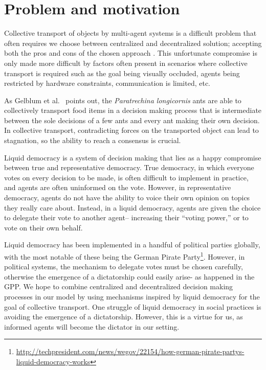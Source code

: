\documentclass[12pt]{article}
\begin{document}

\section{Problem and motivation} 
Collective transport of objects by multi-agent systems is a difficult problem that often requires we choose between centralized and decentralized solution; accepting both the pros and cons of the chosen approach \cite{rubenstein2013collective, chen2015occlusion, mccreery2016collective}. 
This unfortunate compromise is only made more difficult by factors often present in scenarios where collective transport is required such as the goal being visually occluded, agents being restricted by hardware constraints, communication is limited, etc.


As Gelblum et al.~\cite{gelblum2015ant} points out, the \emph{Paratrechina longicornis} ants are able to collectively transport food items in a decision making process that is intermediate between the sole decisions of a few ants and every ant making their own decision.
In collective transport, contradicting forces on the transported object can lead to stagnation, so the ability to reach a consensus is crucial.



Liquid democracy is a system of decision making that lies as a happy compromise between true and representative democracy.
True democracy, in which everyone votes on every decision to be made, is often difficult to implement in practice, and agents are often uninformed on the vote.
However, in representative democracy, agents do not have the ability to voice their own opinion on topics they really care about.
Instead, in a liquid democracy, agents are given the choice to delegate their vote to another agent-- increasing their ``voting power,'' or to vote on their own behalf.


Liquid democracy has been implemented in a handful of political parties globally, with the most notable of these being the German Pirate Party\footnote{\url{http://techpresident.com/news/wegov/22154/how-german-pirate-partys-liquid-democracy-works}}.
However, in political systems, the mechanism to delegate votes must be chosen carefully, otherwise the emergence of a dictatorship could easily arise- as happened in the GPP.
We hope to combine centralized and decentralized decision making processes in our model by using mechanisms inspired by liquid democracy for the goal of collective transport.
One struggle of liquid democracy in social practices is avoiding the emergence of a dictatorship.
However, this is a virtue for us, as informed agents will become the dictator in our setting.
\end{document}
